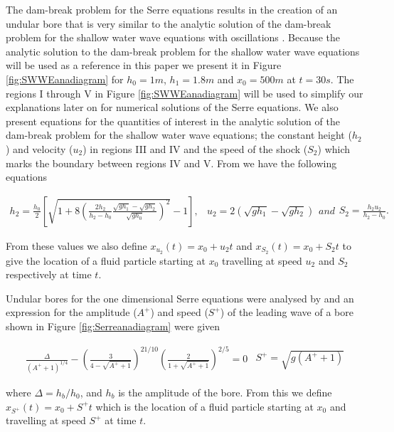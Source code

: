 \documentclass[SingleSpace,12pt,Journal]{Serre_ASCE}
\begin{document}
The dam-break problem for the Serre equations results in the creation of an undular bore that is very similar to the analytic solution of the dam-break problem for the shallow water wave equations with oscillations \cite{Hank-etal-2010-2034,Dutykh-2014-315}. Because the analytic solution to the dam-break problem for the shallow water wave equations will be used as a reference in this paper we present it in Figure \ref{fig:SWWEanadiagram} for $h_0 = 1m$, $h_1 =1.8m$ and $x_0 = 500m$ at $t=30s$. The regions I through V in Figure \ref{fig:SWWEanadiagram} will be used to simplify our explanations later on for numerical solutions of the Serre equations. We also present equations for the quantities of interest in the analytic solution of the dam-break problem for the shallow water wave equations; the constant height ($h_2$) and velocity ($u_2$) in regions III and IV and the speed of the shock ($S_2$) which marks the boundary between regions IV and V.  From  we have the following equations
\begin{linenomath*}
\begin{subequations}
\begin{gather}
h_2 = \frac{h_0}{2} \left[\sqrt{1 + 8 \left(\frac{2h_2}{h_2 - h_0}\frac{\sqrt{gh_1} - \sqrt{gh_2}}{\sqrt{gh_0}}\right)^2} - 1\right],
\end{gather}
	\begin{gather}
	u_2 = 2\left(\sqrt{gh_1} - \sqrt{gh_2}\right)
	\end{gather}
and
	\begin{gather}
	S_2 = \frac{h_2 u_2}{h_2 - h_0}.
	\end{gather}
\label{eq:WuSWWE}	
\end{subequations}
\end{linenomath*}
From these values we also define $x_{u_2}(t) = x_0 + u_2t$ and $x_{S_2}(t) = x_0 + S_2t$ to give the location of a fluid particle starting at $x_0$ travelling at speed $u_2$ and $S_2$ respectively at time $t$.

Undular bores for the one dimensional Serre equations were analysed by  and an expression for the amplitude ($A^+$) and speed ($S^+$) of the leading wave of a bore shown in Figure \ref{fig:Serreanadiagram} were given


\begin{linenomath*}
	\begin{subequations}
\begin{gather}
\frac{\Delta}{\left(A^+ + 1\right)^{1/4}} - \left(\frac{3}{4 -  \sqrt{A^+ + 1}}\right)^{21/10} \left(\frac{2}{1 + \sqrt{A^+ + 1}}\right)^{2/5} = 0
\label{eq:aplusdef}
\end{gather}
\begin{gather}
S^+ = \sqrt{g \left(A^+ + 1\right)}
\label{eq:splusdef}
\end{gather}
		\label{eq:ELWhitMod}	
	\end{subequations}
\end{linenomath*}
where $\Delta = h_b / h_0$, and $h_b$ is the amplitude of the bore. From this we define $x_{S^+}(t) = x_0 + S^+t$ which is the location of a fluid particle starting at $x_0$ and travelling at speed $S^+$ at time $t$.
\end{document}
